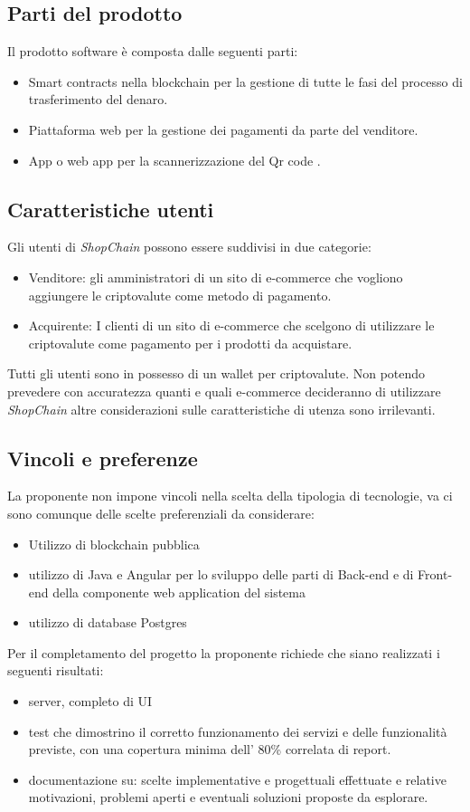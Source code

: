 \documentclass[a4paper, 12pt]{article}
\begin{document}
\subsection{Parti del prodotto}
Il prodotto software è composta dalle seguenti parti:
\begin{itemize}
\item Smart contracts nella blockchain per la gestione di tutte le fasi del processo di trasferimento del denaro.
\item Piattaforma web per la gestione dei pagamenti da parte del venditore.
\item App o web app per la scannerizzazione del Qr code .
\end{itemize}
\subsection{Caratteristiche utenti}
Gli utenti di \textit{ShopChain} possono essere suddivisi in due categorie:
\begin{itemize}
\item Venditore: gli amministratori di un sito di e-commerce che vogliono aggiungere le criptovalute come metodo di pagamento.
\item Acquirente: I clienti di un sito di e-commerce che scelgono di utilizzare le criptovalute come pagamento per i prodotti da acquistare.
\end{itemize}
Tutti gli utenti sono in possesso di un wallet per criptovalute. 
Non potendo prevedere con accuratezza quanti e quali e-commerce decideranno di utilizzare \textit{ShopChain} altre considerazioni sulle caratteristiche di utenza sono irrilevanti.
\subsection{Vincoli e preferenze}
La proponente non impone vincoli nella scelta della tipologia di tecnologie, va ci sono comunque delle scelte preferenziali da considerare:
\begin{itemize}
\item Utilizzo di blockchain pubblica
\item utilizzo di Java e Angular per lo sviluppo delle parti di Back-end e di Front-end della componente web application del sistema
\item utilizzo di database Postgres
\end{itemize}

Per il completamento del progetto la proponente richiede che siano realizzati i seguenti risultati:
\begin{itemize}
\item server, completo di UI
\item test che dimostrino il corretto funzionamento dei servizi e delle funzionalità previste, con una copertura minima dell' 80\% correlata di report.
\item documentazione su: scelte implementative e progettuali effettuate e relative motivazioni, problemi aperti e eventuali soluzioni proposte da esplorare.
\end{itemize}
\end{document}
